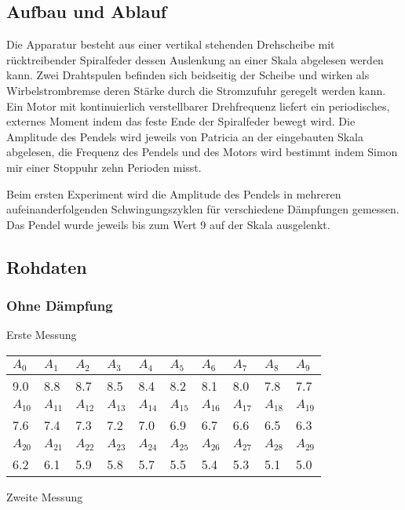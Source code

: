 \documentclass[12pt,a4paper]{article}
\begin{document}
\subsection*{Aufbau und Ablauf}
Die Apparatur besteht aus einer vertikal stehenden Drehscheibe mit r\"ucktreibender Spiralfeder dessen Auslenkung an einer Skala abgelesen werden kann. Zwei Drahtspulen befinden sich beidseitig der Scheibe und wirken als Wirbelstrombremse deren St\"arke durch die Stromzufuhr geregelt werden kann. Ein Motor mit kontinuierlich verstellbarer Drehfrequenz liefert ein periodisches, externes Moment indem das feste Ende der Spiralfeder bewegt wird. Die Amplitude des Pendels wird jeweils von Patricia an der eingebauten Skala abgelesen, die Frequenz des Pendels und des Motors wird bestimmt indem Simon mir einer Stoppuhr zehn Perioden misst.

Beim ersten Experiment wird die Amplitude des Pendels in mehreren aufeinanderfolgenden Schwingungszyklen für verschiedene Dämpfungen gemessen. Das Pendel wurde jeweils bis zum Wert 9 auf der Skala ausgelenkt.

\subsection*{Rohdaten}
\subsubsection*{Ohne D\"ampfung}
Erste Messung

\vspace{3pt}
\begin{tabular}{|l|l|l|l|l|l|l|l|l|l|}
\hline
$A_{0}$&$A_{1}$&$A_{2}$&$A_{3}$&$A_{4}$&$A_{5}$&$A_{6}$&$A_{7}$&$A_{8}$&$A_{9}$\\
\hline
9.0&8.8&8.7&8.5&8.4&8.2&8.1&8.0&7.8&7.7\\
\hline
\hline
$A_{10}$&$A_{11}$&$A_{12}$&$A_{13}$&$A_{14}$&$A_{15}$&$A_{16}$&$A_{17}$&$A_{18}$&$A_{19}$\\
\hline
7.6&7.4&7.3&7.2&7.0&6.9&6.7&6.6&6.5&6.3\\
\hline
\hline
$A_{20}$&$A_{21}$&$A_{22}$&$A_{23}$&$A_{24}$&$A_{25}$&$A_{26}$&$A_{27}$&$A_{28}$&$A_{29}$\\
\hline
6.2&6.1&5.9&5.8&5.7&5.5&5.4&5.3&5.1&5.0\\
\hline
\end{tabular}

\vspace{10pt}
Zweite Messung
\end{document}
